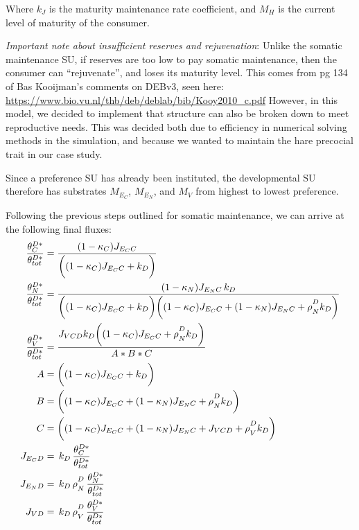 \documentclass[
]{article}
\begin{document}
Where \(k_{\scriptscriptstyle J}\) is the maturity maintenance rate
coefficient, and \(M_H\) is the current level of maturity of the
consumer.

\emph{Important note about insufficient reserves and rejuvenation}:
Unlike the somatic maintenance SU, if reserves are too low to pay
somatic maintenance, then the consumer can ``rejuvenate'', and loses its
maturity level. This comes from pg 134 of Bas Kooijman's comments on
DEBv3, seen here:
\url{https://www.bio.vu.nl/thb/deb/deblab/bib/Kooy2010_c.pdf} However,
in this model, we decided to implement that structure can also be broken
down to meet reproductive needs. This was decided both due to efficiency
in numerical solving methods in the simulation, and because we wanted to
maintain the hare precocial trait in our case study.

Since a preference SU has already been instituted, the developmental SU
therefore has substrates \(M_{E_C}\), \(M_{E_N}\), and \(M_{V}\) from
highest to lowest preference.

Following the previous steps outlined for somatic maintenance, we can
arrive at the following final fluxes: \begin{align}
\frac{\theta^{D*}_C}{\theta^{D*}_{tot}} &= \frac{(1 - {\kappa_C}){J_{{E_C}C}}}{\biggl((1 - {\kappa_C}){J_{{E_C}C}} + {k_D}\biggr)}
\\
\frac{\theta^{D*}_N}{\theta^{D*}_{tot}}&= \frac{(1 - {\kappa_N}){J_{{E_N}C}}\,{k_D}}{\biggl((1 - {\kappa_C}){J_{{E_C}C}} + {k_D}\biggr)\biggl({(1 - {\kappa_C}){J_{{E_C}C}} + (1 - {\kappa_N}){J_{{E_N}C}} + {\rho\strut^D_N}{k_D}\biggr)}}
\\
\frac{\theta^{D*}_V}{\theta^{D*}_{tot}}&= \frac{{J_{VCD}}{k_D}\biggl((1 - {\kappa_C}){J_{{E_C}C}} + {\rho\strut^D_N}{k_D}\biggr)}{A * B * C}
\\\nonumber
A &= \biggl((1 - {\kappa_C}){J_{{E_C}C}} + {k_D}\biggr)
\\\nonumber
B &= \biggl((1 - {\kappa_C}){J_{{E_C}C}} + (1 - {\kappa_N}){J_{{E_N}C}} + {\rho\strut^D_N}{k_D}\biggr)
\\\nonumber
C &= \biggl((1 - {\kappa_C}){J_{{E_C}C}} + (1 - {\kappa_N}){J_{{E_N}C}} + {J_{VCD}} + {\rho\strut^D_V}{k_D}\biggr)
\\
J_{{E_C}D} &= \,k_D\,\frac{\theta^{D*}_C}{\theta^{D*}_{tot}} 
\\
J_{{E_N}D} &= \,k_D\,\rho\strut^D_N\,\frac{\theta^{D*}_N}{\theta^{D*}_{tot}}
\\
J_{VD} &= \,k_D\,\rho\strut^D_V\,\frac{\theta^{D*}_V}{\theta^{D*}_{tot}}
\end{align}
\end{document}
